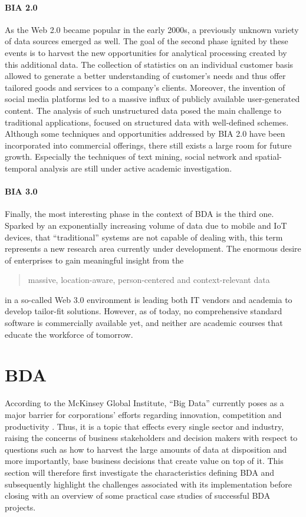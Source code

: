 \paragraph{\ac{BIA} 2.0} As the Web 2.0 became popular in the early 2000s, a previously unknown variety of data sources emerged as well. The goal of the second phase ignited by these events is to harvest the new opportunities for analytical processing created by this additional data. The collection of statistics on an individual customer basis allowed to generate a better understanding of customer's needs and thus offer tailored goods and services to a company's clients.
Moreover, the invention of social media platforms led to a massive influx of publicly available user-generated content. The analysis of such unstructured data posed the main challenge to traditional applications, focused on structured data with well-defined schemes. Although some techniques and opportunities addressed by \ac{BIA} 2.0 have been incorporated into commercial offerings, there still exists a large room for future growth. Especially the techniques of text mining, social network and spatial-temporal analysis are still under active academic investigation.

\paragraph{\ac{BIA} 3.0} Finally, the most interesting phase in the context of \ac{BDA} is the third one. Sparked by an exponentially increasing volume of data due to mobile and \ac{IoT} devices, that \enquote{traditional} systems are not capable of dealing with, this term represents a new research area currently under development. The enormous desire of enterprises to gain meaningful insight from the \blockcquote[p.~1168]{chen2012business}{massive, location-aware, person-centered and context-relevant data} in a so-called Web 3.0 environment is leading both IT vendors and academia to develop tailor-fit solutions. However, as of today,  no comprehensive standard software is commercially available yet, and neither are academic courses that educate the workforce of tomorrow.

\section{\acl{BDA}}
\label{sota-bda}

According to the McKinsey Global Institute, \enquote{Big Data} currently poses as a major barrier for corporations' efforts regarding innovation, competition and productivity \autocite[p.~1 \psqq]{mckinseybd}. Thus, it is a topic that effects every single sector and industry, raising the concerns of business stakeholders and decision makers with respect to questions such as how to harvest the large amounts of data at disposition and more importantly, base business decisions that create value on top of it. This section will therefore first investigate the characteristics defining \ac{BDA} and subsequently highlight the challenges associated with its implementation before closing with an overview of some practical case studies of successful \ac{BDA} projects. 

